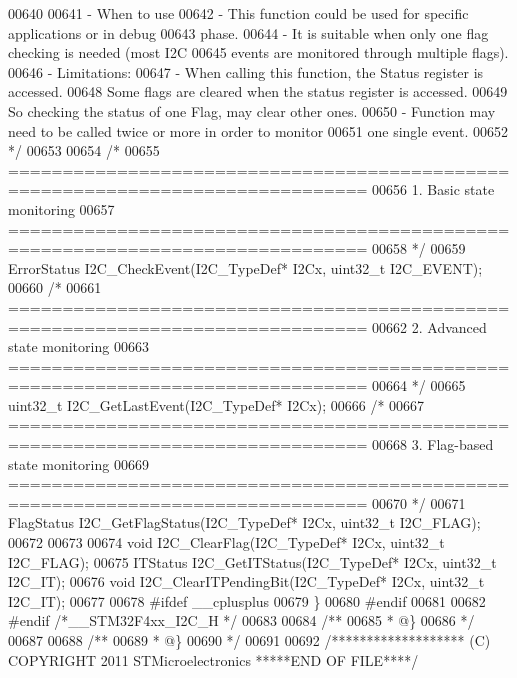 \begin{DoxyCode}
00640 \textcolor{comment}{}
00641 \textcolor{comment}{          - When to use}
00642 \textcolor{comment}{             - This function could be used for specific applications or in debug }
00643 \textcolor{comment}{               phase.}
00644 \textcolor{comment}{             - It is suitable when only one flag checking is needed (most I2C }
00645 \textcolor{comment}{               events are monitored through multiple flags).}
00646 \textcolor{comment}{          - Limitations: }
00647 \textcolor{comment}{             - When calling this function, the Status register is accessed. }
00648 \textcolor{comment}{               Some flags are cleared when the status register is accessed. }
00649 \textcolor{comment}{               So checking the status of one Flag, may clear other ones.}
00650 \textcolor{comment}{             - Function may need to be called twice or more in order to monitor }
00651 \textcolor{comment}{               one single event.           }
00652 \textcolor{comment}{ */}
00653 
00654 \textcolor{comment}{/*}
00655 \textcolor{comment}{ ===============================================================================}
00656 \textcolor{comment}{                          1. Basic state monitoring}
00657 \textcolor{comment}{ ===============================================================================}
00658 \textcolor{comment}{ */}
00659 ErrorStatus I2C_CheckEvent(I2C\_TypeDef* I2Cx, uint32\_t I2C\_EVENT);
00660 \textcolor{comment}{/*}
00661 \textcolor{comment}{ ===============================================================================}
00662 \textcolor{comment}{                          2. Advanced state monitoring}
00663 \textcolor{comment}{ ===============================================================================}
00664 \textcolor{comment}{ */}
00665 uint32\_t I2C_GetLastEvent(I2C\_TypeDef* I2Cx);
00666 \textcolor{comment}{/*}
00667 \textcolor{comment}{ ===============================================================================}
00668 \textcolor{comment}{                          3. Flag-based state monitoring}
00669 \textcolor{comment}{ ===============================================================================}
00670 \textcolor{comment}{ */}
00671 FlagStatus I2C_GetFlagStatus(I2C\_TypeDef* I2Cx, uint32\_t I2C\_FLAG);
00672 
00673 
00674 \textcolor{keywordtype}{void} I2C_ClearFlag(I2C\_TypeDef* I2Cx, uint32\_t I2C\_FLAG);
00675 ITStatus I2C_GetITStatus(I2C\_TypeDef* I2Cx, uint32\_t I2C\_IT);
00676 \textcolor{keywordtype}{void} I2C_ClearITPendingBit(I2C\_TypeDef* I2Cx, uint32\_t I2C\_IT);
00677 
00678 \textcolor{preprocessor}{#}\textcolor{preprocessor}{ifdef} \_\_cplusplus
00679 \}
00680 \textcolor{preprocessor}{#}\textcolor{preprocessor}{endif}
00681 
00682 \textcolor{preprocessor}{#}\textcolor{preprocessor}{endif} \textcolor{comment}{/*\_\_STM32F4xx\_I2C\_H */}
00683 
00684 \textcolor{comment}{/**}
00685 \textcolor{comment}{  * @\}}
00686 \textcolor{comment}{  */}
00687 
00688 \textcolor{comment}{/**}
00689 \textcolor{comment}{  * @\}}
00690 \textcolor{comment}{  */}
00691 
00692 \textcolor{comment}{/******************* (C) COPYRIGHT 2011 STMicroelectronics *****END OF FILE****/}
\end{DoxyCode}
